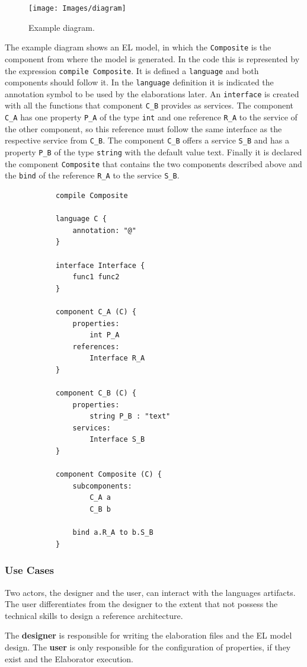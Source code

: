 \documentclass{report}
\begin{document}
			\begin{figure} [H]
				\centering
				\texttt{[image: Images/diagram]}
				\caption{Example diagram.}
				\label{fig:example-diagram}
			\end{figure}
			
			\par The example diagram shows an EL model, in which the \texttt{Composite} is the component from where the model is generated. In the code this is represented by the expression \texttt{compile Composite}. It is defined a \texttt{language} and both components should follow it. In the \texttt{language} definition it is indicated the annotation symbol to be used by the elaborations later. An \texttt{interface} is created with all the functions that component \texttt{C\_B} provides as services. The component \texttt{C\_A} has one property \texttt{P\_A} of the type \texttt{int} and one reference \texttt{R\_A} to the service of the other component, so this reference must follow the same interface as the respective service from \texttt{C\_B}. The component \texttt{C\_B} offers a service \texttt{S\_B} and has a property \texttt{P\_B} of the type \texttt{string} with the default value text. Finally it is declared the component \texttt{Composite} that contains the two components described above and the \texttt{bind} of the reference \texttt{R\_A} to the service \texttt{S\_B}.
			
			\begin{lstlisting}
			compile Composite

			language C {
				annotation: "@"
			}
			
			interface Interface {
				func1 func2
			}
			
			component C_A (C) {
				properties:
					int P_A
				references:
					Interface R_A
			}
			
			component C_B (C) {
				properties:
					string P_B : "text"
				services:
					Interface S_B
			}
			
			component Composite (C) {
				subcomponents:
					C_A a
					C_B b
				
				bind a.R_A to b.S_B
			}
			\end{lstlisting} 

			\subsubsection{Use Cases}
			
			\par Two actors, the designer and the user, can interact with the languages artifacts. The user differentiates
			from the designer to the extent that not possess the technical skills to design a reference architecture.
			\par The \textbf{designer} is responsible for writing the elaboration files and the EL model design. The \textbf{user} is only responsible for the configuration of properties, if they exist and the Elaborator execution.
			
\end{document}
